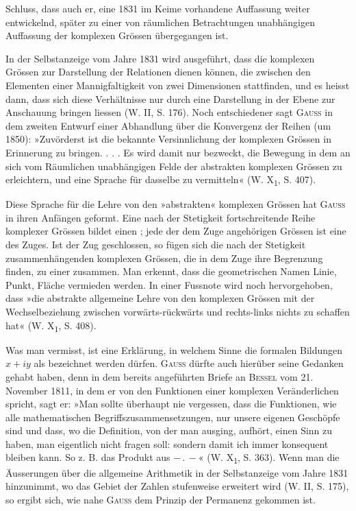 Schluss, dass auch er, eine 1831 im Keime vorhandene Auffassung weiter
entwickelnd, später zu einer von räumlichen Betrachtungen unabhängigen Auffassung
der komplexen Grössen übergegangen ist.
\par
In der Selbstanzeige vom Jahre 1831 wird ausgeführt, dass die komplexen
Grössen zur Darstellung der Relationen dienen können, die zwischen den Elementen
einer Mannigfaltigkeit von zwei Dimensionen stattfinden, und es heisst
dann, dass sich diese Verhältnisse nur durch eine Darstellung in der Ebene
zur Anschauung bringen liessen (W. II, S. 176). Noch entschiedener sagt
\textsc{Gauss} in dem zweiten Entwurf einer Abhandlung über die Konvergenz der
Reihen (um 1850): »Zuvörderst ist die bekannte Versinnlichung der komplexen
Grössen in Erinnerung zu bringen. . . . Es wird damit nur bezweckt, die
Bewegung in dem an sich vom Räumlichen unabhängigen Felde der abstrakten
komplexen Grössen zu erleichtern, und eine Sprache für dasselbe zu vermitteln«
(W. X\textsubscript{1}, S. 407).
\par
Diese Sprache für die Lehre von den »abstrakten« komplexen Grössen
hat \textsc{Gauss} in ihren Anfängen geformt. Eine nach der Stetigkeit fortschreitende
Reihe komplexer Grössen bildet einen ; jede der dem Zuge angehörigen
Grössen ist eine  des Zuges. Ist der Zug geschlossen, so fügen sich
die nach der Stetigkeit zusammenhängenden komplexen Grössen, die in dem
Zuge ihre Begrenzung finden, zu einer  zusammen. Man erkennt,
dass die geometrischen Namen Linie, Punkt, Fläche vermieden werden. In
einer Fussnote wird noch hervorgehoben, dass »die abstrakte allgemeine Lehre
von den komplexen Grössen mit der Wechselbeziehung zwischen vorwärts-rückwärts
und rechts-links nichts zu schaffen hat« (W. X\textsubscript{1}, S. 408).
\par
Was man vermisst, ist eine Erklärung, in welchem Sinne die formalen
Bildungen \(x+iy\) als  bezeichnet werden dürfen. \textsc{Gauss} dürfte auch
hierüber seine Gedanken gehabt haben, denn in dem bereits angeführten Briefe
\clearpage{}
\noindent an \textsc{Bessel} vom 21. November 1811, in dem er von den Funktionen einer
komplexen Veränderlichen spricht, sagt er: »Man sollte überhaupt nie vergessen,
dass die Funktionen, wie alle mathematischen Begriffszusammensetzungen,
nur unsere eigenen Geschöpfe sind und dass, wo die Definition,
von der man ausging, aufhört, einen Sinn zu haben, man eigentlich nicht
fragen soll:  sondern  damit ich
immer konsequent bleiben kann. So z. B. das Produkt aus \(-\, .\, -\)« (W. X\textsubscript{1},
S. 363). Wenn man die Äusserungen über die allgemeine Arithmetik in der
Selbstanzeige vom Jahre 1831 hinzunimmt, wo das Gebiet der Zahlen stufenweise
erweitert wird (W. II, S. 175), so ergibt sich, wie nahe \textsc{Gauss} dem
Prinzip der Permanenz gekommen ist.
\clearpage\endgroup
